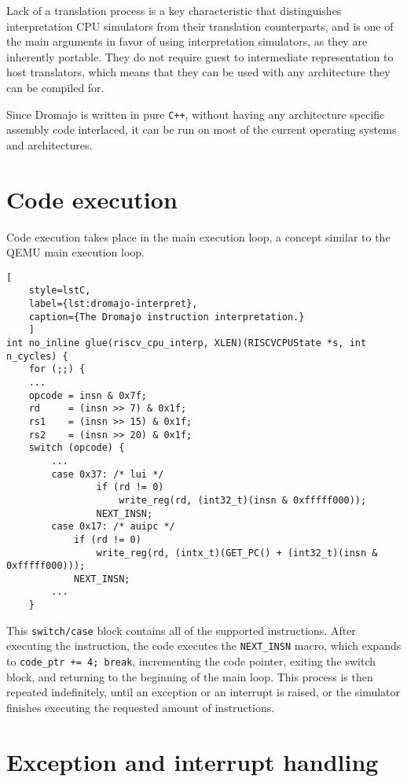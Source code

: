 Lack of a translation process is a key characteristic that distinguishes interpretation CPU simulators from their
translation counterparts, and is one of the main arguments in favor of using interpretation simulators, as they
are inherently portable. They do not require guest to intermediate representation to host translators, which
means that they can be used with any architecture they can be compiled for.

Since Dromajo is written in pure \texttt{C++}, without having any architecture specific assembly code interlaced, it can be run on most
of the current operating systems and architectures.

\pagebreak

\section{Code execution}

Code execution takes place in the main execution loop, a concept similar to the QEMU main execution loop.

\begin{lstlisting}[
    style=lstC,
    label={lst:dromajo-interpret},
    caption={The Dromajo instruction interpretation.}
    ]
int no_inline glue(riscv_cpu_interp, XLEN)(RISCVCPUState *s, int n_cycles) {
    for (;;) {
    ...
    opcode = insn & 0x7f;
    rd     = (insn >> 7) & 0x1f;
    rs1    = (insn >> 15) & 0x1f;
    rs2    = (insn >> 20) & 0x1f;
    switch (opcode) {
        ...
        case 0x37: /* lui */
                if (rd != 0)
                    write_reg(rd, (int32_t)(insn & 0xfffff000));
                NEXT_INSN;
        case 0x17: /* auipc */
            if (rd != 0)
                write_reg(rd, (intx_t)(GET_PC() + (int32_t)(insn & 0xfffff000)));
            NEXT_INSN;
        ...
    }
\end{lstlisting}

\noindent
This \texttt{switch/case} block contains all of the supported instructions. After executing the instruction, the code
executes the \texttt{NEXT\_INSN} macro, which expands to \texttt{code\_ptr += 4; break}, incrementing the code pointer,
exiting the switch block, and returning to the beginning of the main loop. This process is then repeated indefinitely,
until an exception or an interrupt is raised, or the simulator finishes executing the requested amount of
instructions.

\section{Exception and interrupt handling}

